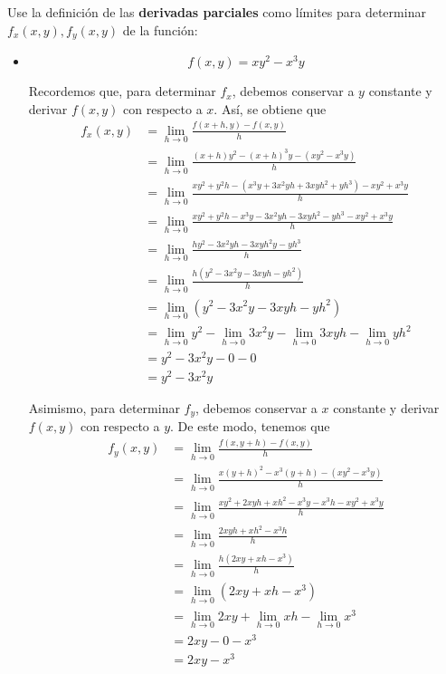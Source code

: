 \documentclass[12pt]{article}
\begin{document}
\section{}

Use la definición de las \textbf{derivadas parciales} como límites para determinar $f_x(x, y), f_y(x, y)$ de la función:

\begin{itemize}[format=\textbf]

\item $$f(x, y) = xy^2 - x^3y$$

  Recordemos que, para determinar $f_x$, debemos conservar a $y$ constante y derivar $f (x, y)$ con respecto a $x$. Así, se obtiene que
  \begin{align*}
    f_x(x,y)
    &= \lim_{h\to 0} \frac{f(x+h,y)-f(x,y)}{h} \\
    &= \lim_{h\to 0} \frac{(x+h)y^2 - (x+h)^3y- (xy^2 - x^3y)}{h} \\
    &= \lim_{h\to 0} \frac{xy^2+y^2h - (x^3y+3x^2yh+3xyh^2+yh^3) - xy^2 + x^3y}{h} \\
    &= \lim_{h\to 0} \frac{xy^2+y^2h - x^3y - 3x^2yh -3xyh^2 -yh^3 - xy^2 + x^3y}{h} \\
    &= \lim_{h\to 0} \frac{hy^2 - 3x^2yh -3xyh^2y - yh^3}{h} \\
    &= \lim_{h\to 0} \frac{h(y^2 - 3x^2y -3xyh - yh^2)}{h} \\
    &= \lim_{h\to 0} (y^2 - 3x^2y - 3xyh - yh^2) \\
    &= \lim_{h\to 0} y^2 - \lim_{h\to 0}3x^2y - \lim_{h\to 0}3xyh - \lim_{h\to 0}yh^2 \\
    &= y^2 - 3x^2y - 0 - 0 \\
    &= y^2 - 3x^2y
  \end{align*}
    

  Asimismo, para determinar $f_y$, debemos conservar a $x$ constante y derivar $f(x,y)$ con respecto a $y$. De este modo, tenemos que
  \begin{align*}
    f_y(x,y)
    &= \lim_{h\to 0} \frac{f(x,y+h)-f(x,y)}{h} \\
    &= \lim_{h\to 0} \frac{x(y+h)^2 - x^3(y+h) - (xy^2 - x^3y)}{h} \\
    &= \lim_{h\to 0} \frac{xy^2 + 2xyh + xh^2 - x^3y - x^3h - xy^2 + x^3y}{h} \\
    &= \lim_{h\to 0} \frac{2xyh + xh^2 - x^3h}{h} \\
    &= \lim_{h\to 0} \frac{h(2xy + xh - x^3)}{h} \\
    &= \lim_{h\to 0} (2xy + xh - x^3) \\
    &= \lim_{h\to 0} 2xy + \lim_{h\to 0}xh - \lim_{h\to 0}x^3 \\
    &= 2xy - 0- x^3 \\
    &= 2xy - x^3
  \end{align*}

\end{itemize}
\end{document}
